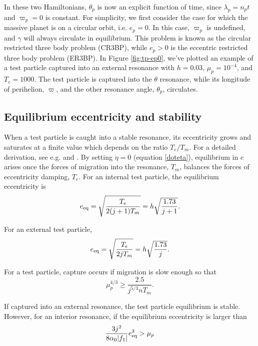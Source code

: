 \documentclass[usenatbib,twocolumn]{mnras}
\DeclarePairedDelimiter{\abs}{|}{|}
\begin{document}
In these two Hamiltonians, \(\theta_p\) is now an explicit function of
time, since \(\lambda_p=n_p t\) and \(\varpi_p=0\) is constant.  For
simplicity, we first consider the case for which the massive planet is
on a circular orbit, i.e. \(e_p=0\).
In this case, \(\varpi_p\) is undefined, and \(\gamma\) will
always circulate in equilibrium.
This problem is known as the circular restricted three
body problem (CR3BP), while \(e_p>0\) is the eccentric restricted three
body problem (ER3BP).  In Figure \ref{fig:tp-ep0}, we've plotted an
example of a test particle captured into an external resonance with
\(h=0.03\), \(\mu_p = 10^{-4}\), and \(T_{e} = 1000\).  The test particle is
captured into the \(\theta\) resonance, while its longitude of
perihelion, \(\varpi\), and the other resonance angle, \(\theta_p\),
circulates.

\subsection{Equilibrium eccentricity and stability}
\label{sec:orgb3ea23b}
When a test particle is caught into a stable resonance, its
eccentricity grows and saturates at a finite value which depends on
the ratio \(T_{e}/T_{m}\).  For a detailed derivation, see e.g.
\citep{goldreich_overstable_2014} and \citep{xu_migration_2018}.
By setting \(\dot\eta=0\) (equation \ref{doteta}), equilibrium
in \(e\) arises once the forces of migration into the resonance, \(T_m\), balances
the forces of eccentricity damping, \(T_e\). For an internal
test particle, the equilibrium eccentricity is
\begin{equation}
\label{eq:eeqint}
  e_{\rm eq} = \sqrt{\frac{T_e}{2(j+1)T_m}} = h\sqrt{\frac{1.73}{j+1}}.
\end{equation}

\noindent
For an external test particle,
\begin{equation}
\label{eq:eeqext}
  e_{\rm eq} = \sqrt{\frac{T_e}{2jT_m}} = h\sqrt{\frac{1.73}{j}}.
\end{equation}

For a test particle, capture occurs if migration is slow enough so that
\citep{goldreich_overstable_2014}
\begin{equation}
\mu_p^{4/3} \geq \frac{2.5}{j^{5/3}n T_m}.
\end{equation}

\noindent
If captured into an external resonance, the test particle equilibrium
is stable. However, for an interior resonance, if the equilibrium
eccentricity is larger than
\begin{equation}
  \frac{3j^2}{8\alpha_0 \abs{f_1}}e_{\rm eq}^3 > \mu_p
\end{equation}
\end{document}

